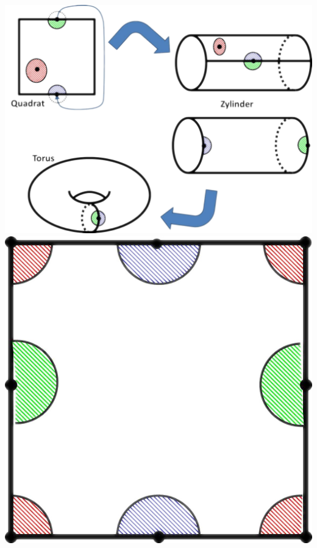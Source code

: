 \documentclass[a4paper,11pt,notitlepage]{report}
\theoremstyle{definition}
\begin{document}
\includegraphics[scale=0.6]{images/Identifizierung_Umgebungen.png}\newline
\includegraphics[scale=0.6]{images/Identifizierung_Umgebungen2.png}

\newpage
\end{document}
